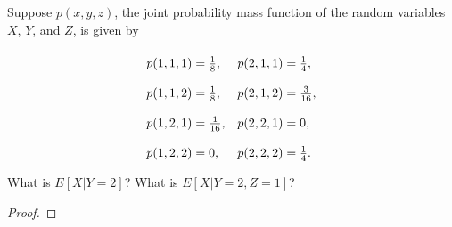 \begin{problem}{3.7}
  Suppose $p(x, y, z)$, the joint probability mass function of the random variables
  $X$, $Y$, and $Z$, is given by
  \begin{align*}
    \renewcommand\arraystretch{2}
    \begin{array}{ll}
      p(1, 1, 1) = \frac{1}{8}, & p(2, 1, 1) = \frac{1}{4},\\
      p(1, 1, 2) = \frac{1}{8}, & p(2, 1, 2) = \frac{3}{16},\\
      p(1, 2, 1) = \frac{1}{16}, & p(2, 2, 1) = 0,\\
      p(1, 2, 2) = 0, & p(2, 2, 2) = \frac{1}{4}.
    \end{array}
  \end{align*}
  What is $E[X | Y=2]$? What is $E[X|Y=2, Z=1]$?
\end{problem}

\begin{proof}
\end{proof}
\newpage
